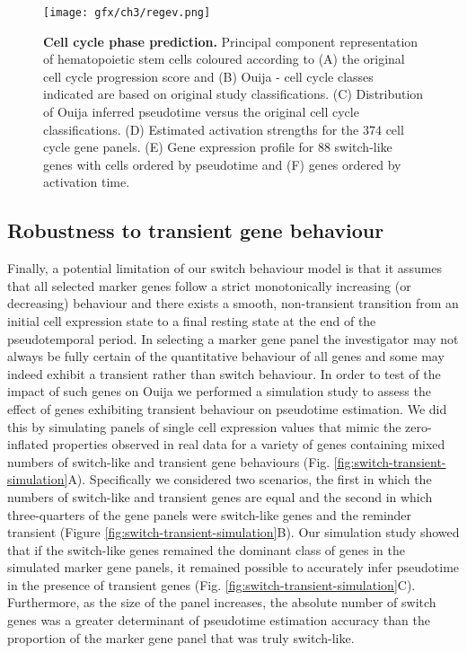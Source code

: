 \begin{figure}[!t]
	\texttt{[image: gfx/ch3/regev.png]}
	\caption{{\bf Cell cycle phase prediction.} Principal component representation of hematopoietic stem cells coloured according to (A) the original cell cycle progression score \cite{kowalczyk2015single} and (B) Ouija - cell cycle classes indicated are based on original study classifications. (C) Distribution of Ouija inferred pseudotime versus the original cell cycle classifications. (D) Estimated activation strengths for the 374 cell cycle gene panels. (E) Gene expression profile for 88 switch-like genes with cells ordered by pseudotime and (F) genes ordered by activation time.}
	\label{fig:regev}
\end{figure}


\subsection{Robustness to transient gene behaviour}

Finally, a potential limitation of our switch behaviour model is that it assumes that all selected marker genes follow a strict monotonically increasing (or decreasing) behaviour and there exists a smooth, non-transient transition from an initial cell expression state to a final resting state at the end of the pseudotemporal period. In selecting a marker gene panel the investigator may not always be fully certain of the quantitative behaviour of all genes and some may indeed exhibit a transient rather than switch behaviour. In order to test of the impact of such genes on Ouija we performed a simulation study to assess the effect of genes exhibiting transient behaviour on pseudotime estimation. We did this by simulating panels of single cell expression values that mimic the zero-inflated properties observed in real data for a variety of genes containing mixed numbers of switch-like and transient gene behaviours (Fig. \ref{fig:switch-transient-simulation}A). Specifically we considered two scenarios, the first in which the numbers of switch-like and transient genes are equal and the second in which three-quarters of the gene panels were switch-like genes and the reminder transient (Figure \ref{fig:switch-transient-simulation}B). Our simulation study showed that if the switch-like genes remained the dominant class of genes in the simulated marker gene panels, it remained possible to accurately infer pseudotime in the presence of transient genes (Fig. \ref{fig:switch-transient-simulation}C). Furthermore, as the size of the panel increases, the absolute number of switch genes was a greater determinant of pseudotime estimation accuracy than the proportion of the marker gene panel that was truly switch-like.

